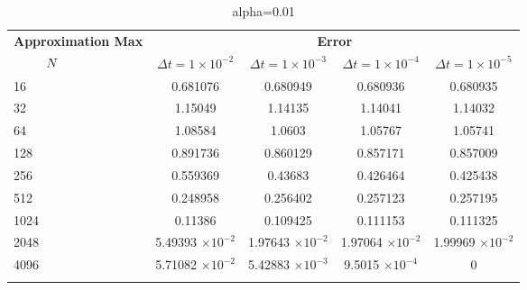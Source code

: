 	
	\begin{table}
		\begin{tabular}{lcccc}
			\toprule
			\multicolumn{1}{c}{\textbf{Approximation Max}} & \multicolumn{4}{c}{\textbf{Error}} \\
			$\hspace{9mm}N$ & $\Delta t=1\times 10^{-2}$ & $\Delta t=1\times 10^{-3}$ & $\Delta t=1\times 10^{-4}$ & $\Delta t=1\times 10^{-5}$ \\
			\midrule
			\hspace{7mm} 16 & 0.681076  & 0.680949   & 0.680936   & 0.680935  \\
			\midrule
			\hspace{7mm} 32 & 1.15049   & 1.14135    & 1.14041    & 1.14032   \\
			\midrule
			\hspace{7mm} 64 & 1.08584   & 1.0603     & 1.05767    & 1.05741   \\
			\midrule
			\hspace{7mm} 128 & 0.891736  & 0.860129   & 0.857171   & 0.857009  \\
			\midrule
			\hspace{7mm} 256 & 0.559369  & 0.43683    & 0.426464   & 0.425438  \\
			\midrule
			\hspace{7mm} 512 & 0.248958  & 0.256402   & 0.257123   & 0.257195  \\
			\midrule
			\hspace{7mm} 1024 & 0.11386   & 0.109425   & 0.111153   & 0.111325  \\
			\midrule
			\hspace{7mm} 2048 & 5.49393 $\times 10 ^{-2}$ & 1.97643 $\times 10 ^{-2}$  & 1.97064 $\times 10 ^{-2}$  & 1.99969 $\times 10 ^{-2}$ \\
			\midrule
			\hspace{7mm} 4096 & 5.71082 $\times 10 ^{-2}$ & 5.42883 $\times 10 ^{-3}$ & 9.5015 $\times 10 ^{-4}$ & 0         \\
			\\
			\bottomrule
		\end{tabular}
		\caption{alpha=0.01}
	\end{table}

